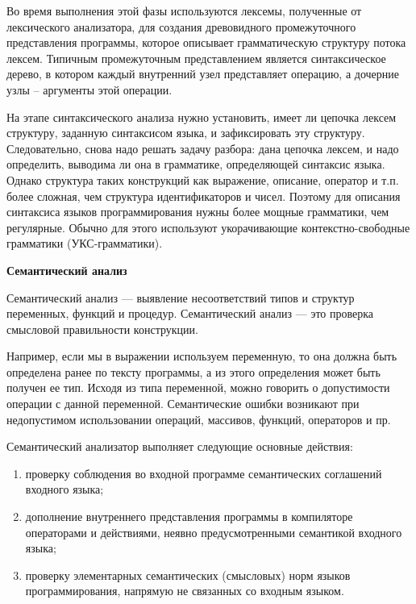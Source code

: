 Во время выполнения этой фазы используются лексемы, полученные от лексического анализатора, для создания древовидного промежуточного представления программы, которое описывает грамматическую структуру потока лексем. Типичным промежуточным представлением является синтаксическое дерево, в котором каждый внутренний узел представляет операцию, а дочерние узлы – аргументы этой операции. 

На этапе синтаксического анализа нужно установить, имеет ли цепочка лексем структуру, заданную синтаксисом языка, и зафиксировать эту структуру. Следовательно, снова надо решать задачу разбора: дана цепочка лексем, и надо определить, выводима ли она в грамматике, определяющей синтаксис языка. Однако структура таких конструкций как выражение, описание, оператор и т.п. более сложная, чем структура идентификаторов и чисел. Поэтому для описания синтаксиса языков программирования нужны более мощные грамматики, чем регулярные. Обычно для этого используют укорачивающие контекстно-свободные грамматики (УКС-грамматики).

\begin{center}{\bfseries Семантический анализ}
\end{center}

\begin{opr}
  Семантический анализ — выявление несоответствий типов и структур переменных, функций и процедур. Семантический анализ — это проверка смысловой правильности конструкции. 
\end{opr}

Например, если мы в выражении используем переменную, то она должна быть определена ранее по тексту программы, а из этого определения может быть получен ее тип. Исходя из типа переменной, можно говорить о допустимости операции с данной переменной. Семантические ошибки возникают при недопустимом использовании операций, массивов, функций, операторов и пр.

Семантический анализатор выполняет следующие основные действия:

\begin{enumerate}
  \item проверку соблюдения во входной программе семантических соглашений входного языка;
  \item дополнение внутреннего представления программы в компиляторе операторами и действиями, неявно предусмотренными семантикой входного языка;
  \item проверку элементарных семантических (смысловых) норм языков программирования, напрямую не связанных со входным языком.
\end{enumerate}

